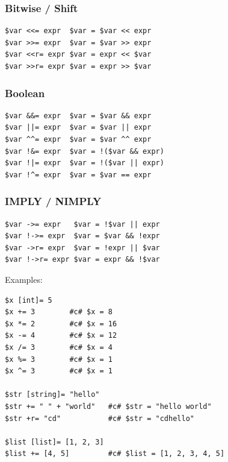 \documentclass{report}
\begin{document}
\subsubsection{Bitwise / Shift}
\begin{verbatim}
$var <<= expr  $var = $var << expr
$var >>= expr  $var = $var >> expr
$var <<r= expr $var = expr << $var
$var >>r= expr $var = expr >> $var
\end{verbatim}

\subsubsection{Boolean}
\begin{verbatim}
$var &&= expr  $var = $var && expr
$var ||= expr  $var = $var || expr
$var ^^= expr  $var = $var ^^ expr
$var !&= expr  $var = !($var && expr)
$var !|= expr  $var = !($var || expr)
$var !^= expr  $var = $var == expr
\end{verbatim}

\subsubsection{IMPLY / NIMPLY}
\begin{verbatim}
$var ->= expr   $var = !$var || expr
$var !->= expr  $var = $var && !expr
$var ->r= expr  $var = !expr || $var
$var !->r= expr $var = expr && !$var
\end{verbatim}

Examples:
\begin{verbatim}
$x [int]= 5
$x += 3        #c# $x = 8
$x *= 2        #c# $x = 16
$x -= 4        #c# $x = 12
$x /= 3        #c# $x = 4
$x %= 3        #c# $x = 1
$x ^= 3        #c# $x = 1

$str [string]= "hello"
$str += " " + "world"   #c# $str = "hello world"
$str +r= "cd"           #c# $str = "cdhello"

$list [list]= [1, 2, 3]
$list += [4, 5]         #c# $list = [1, 2, 3, 4, 5]
\end{verbatim}
\end{document}

